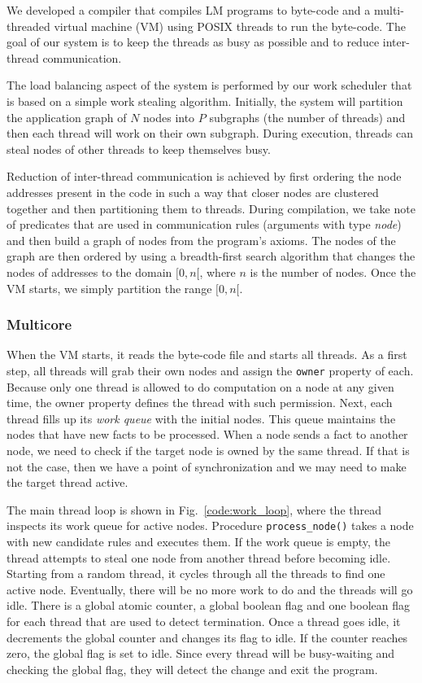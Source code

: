 
We developed a compiler that compiles LM programs to byte-code and a multi-threaded
virtual machine (VM) using POSIX threads to run the byte-code.
The goal of our system is to keep the threads as busy as possible and to reduce inter-thread communication.

The load balancing aspect of the system is performed by our work scheduler that is based on a simple work
stealing algorithm. Initially, the system will partition the application
graph of $N$ nodes into $P$ subgraphs (the number of threads) and then each thread will work on their own subgraph.
During execution, threads can steal nodes of other threads to keep themselves busy.

Reduction of inter-thread communication is achieved by first ordering the node addresses present
in the code in such a way that closer nodes are clustered together and then partitioning them
to threads. During compilation, we take note of predicates that are used in 
communication rules (arguments with type \emph{node}) and then build a graph of nodes from
the program's axioms. The nodes of the graph are then ordered by using a breadth-first search
algorithm that changes the nodes of addresses to the domain $[0, n[$, where $n$ is the number of
nodes. Once the VM starts, we simply partition the range
$[0, n[$.

\subsubsection{Multicore}

When the VM starts, it reads the byte-code file and starts all threads.
As a first step, all threads will grab their own nodes and assign the \texttt{owner} property of each.
Because only one thread is allowed to do computation on a node at any given time, the owner property
defines the thread with such permission.
Next, each thread fills up its \emph{work queue} with the initial nodes. This queue
maintains the nodes that have new facts to be processed.
When a node sends a fact to another node, we need to check if the target node is owned by the same thread.
If that is not the case, then we have a point of synchronization and we may need to
make the target thread active.

The main thread loop is shown in Fig.~\ref{code:work_loop}, where the thread
inspects its work queue for active nodes. Procedure \texttt{process\_node()} takes a node with new candidate rules
and executes them. If the work queue is empty, the thread attempts to steal one node from another thread before
becoming idle. Starting from a random thread, it cycles through all the threads to find one active node.
Eventually, there will be no more work to do and the threads will go idle. There is a global atomic counter, a global
boolean flag and one boolean flag for each thread that are used to detect termination.
Once a thread goes idle, it decrements the global counter and changes its flag to idle. If the counter
reaches zero, the global flag is set to idle. Since every thread will be busy-waiting and checking
the global flag, they will detect the change and exit the program.

